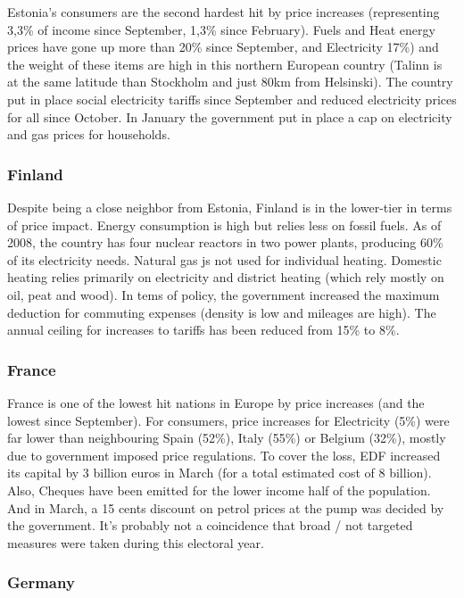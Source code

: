 \documentclass[
  9pt,
  a4paper,
  DIV=11,
  numbers=noendperiod]{scrartcl}
\begin{document}
Estonia's consumers are the second hardest hit by price increases
(representing 3,3\% of income since September, 1,3\% since February).
Fuels and Heat energy prices have gone up more than 20\% since
September, and Electricity 17\%) and the weight of these items are high
in this northern European country (Talinn is at the same latitude than
Stockholm and just 80km from Helsinski). The country put in place social
electricity tariffs since September and reduced electricity prices for
all since October. In January the government put in place a cap on
electricity and gas prices for households.

\hypertarget{finland}{%
\subsubsection{Finland}\label{finland}}

Despite being a close neighbor from Estonia, Finland is in the
lower-tier in terms of price impact. Energy consumption is high but
relies less on fossil fuels. As of 2008, the country has four nuclear
reactors in two power plants, producing 60\% of its electricity needs.
Natural gas js not used for individual heating. Domestic heating relies
primarily on electricity and district heating (which rely mostly on oil,
peat and wood). In tems of policy, the government increased the maximum
deduction for commuting expenses (density is low and mileages are high).
The annual ceiling for increases to tariffs has been reduced from 15\%
to 8\%.

\hypertarget{france}{%
\subsubsection{France}\label{france}}

France is one of the lowest hit nations in Europe by price increases
(and the lowest since September). For consumers, price increases for
Electricity (5\%) were far lower than neighbouring Spain (52\%), Italy
(55\%) or Belgium (32\%), mostly due to government imposed price
regulations. To cover the loss, EDF increased its capital by 3 billion
euros in March (for a total estimated cost of 8 billion). Also, Cheques
have been emitted for the lower income half of the population. And in
March, a 15 cents discount on petrol prices at the pump was decided by
the government. It's probably not a coincidence that broad / not
targeted measures were taken during this electoral year.

\hypertarget{germany}{%
\subsubsection{Germany}\label{germany}}
\end{document}
